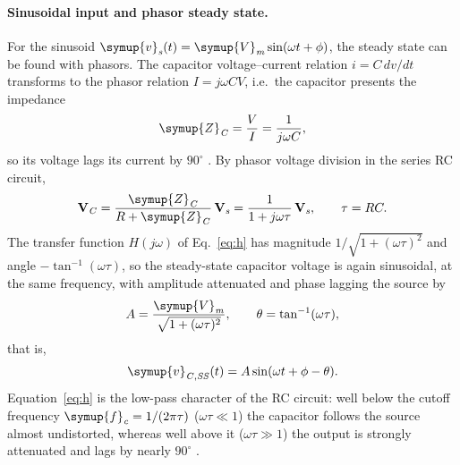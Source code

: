 \documentclass[12pt,a4paper]{article}
\begin{document}
	\paragraph{Sinusoidal input and phasor steady state.}
	For the sinusoid $\symup{v}_{\mathit{s}}(t) = \symup{V}_{\mathit{m}} \sin(\omega t + \phi)$, the steady
	state can be found with phasors.  The capacitor voltage--current
	relation $i = C\,dv/dt$ transforms to the phasor relation
	$I = j\omega C V$, i.e.\ the capacitor presents the impedance
	\begin{equation}
		\symup{Z}_{\mathit{C}} = \frac{V}{I} = \frac{1}{j\omega C},
		\label{eq:zc}
	\end{equation}
	so its voltage lags its current by $90^\circ$ \cite{sadiku}.  By
	phasor voltage division in the series RC circuit,
	\begin{equation}
		\mathbf{V}_{\mathit{C}} = \frac{\symup{Z}_{\mathit{C}}}{R + \symup{Z}_{\mathit{C}}}\,\mathbf{V}_{\mathit{s}}
		= \frac{1}{1 + j\omega\tau}\,\mathbf{V}_{\mathit{s}},
		\qquad \tau = RC .
		\label{eq:h}
	\end{equation}
	The transfer function $H(j\omega)$ of
	Eq.~\eqref{eq:h} has magnitude $1/\sqrt{1 + (\omega\tau)^2}$ and
	angle $-\tan^{-1}(\omega\tau)$, so the steady-state capacitor
	voltage is
	again sinusoidal, at the same frequency, with amplitude attenuated
	and phase lagging the source by
	\begin{equation}
		A = \frac{\symup{V}_{\mathit{m}}}{\sqrt{1 + (\omega\tau)^2}}, \qquad
		\theta = \tan^{-1}(\omega\tau),
		\label{eq:amp-lag}
	\end{equation}
	that is,
	\begin{equation}
		\symup{v}_{\mathit{C,SS}}(t) = A \sin(\omega t + \phi - \theta).
		\label{eq:ss}
	\end{equation}
	Equation~\eqref{eq:h} is the low-pass character of the RC circuit:
	well below the cutoff frequency $\symup{f}_{\mathit{c}} = 1/(2\pi\tau)$
	($\omega\tau \ll 1$) the capacitor follows the source almost
	undistorted, whereas well above it ($\omega\tau \gg 1$) the output is
	strongly attenuated and lags by nearly $90^\circ$ \cite{sadiku}.
	
\end{document}
